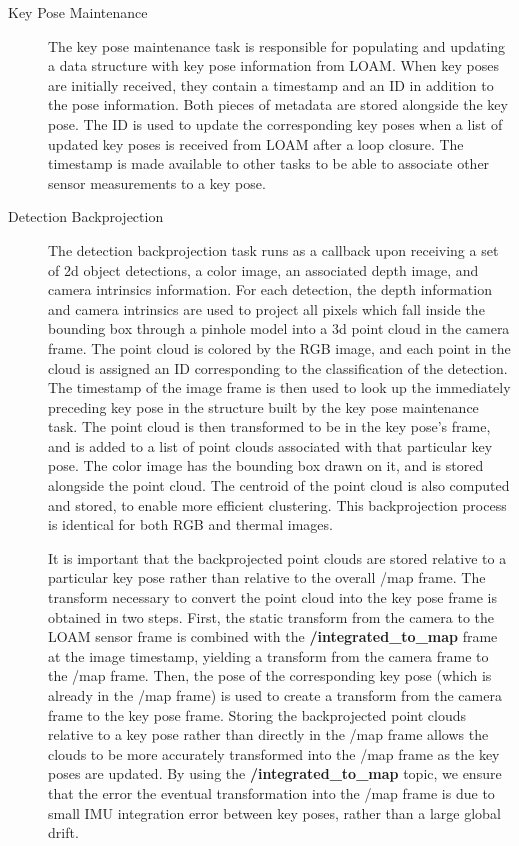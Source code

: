 \begin{description}
	\item[Key Pose Maintenance] The key pose maintenance task is responsible for populating and updating a data structure with key pose information from LOAM. When key poses are initially received, they contain a timestamp and an ID in addition to the pose information. Both pieces of metadata are stored alongside the key pose. The ID is used to update the corresponding key poses when a list of updated key poses is received from LOAM after a loop closure. The timestamp is made available to other tasks to be able to associate other sensor measurements to a key pose.
	
	\item[Detection Backprojection] The detection backprojection task runs as a callback upon receiving a set of 2d object detections, a color image, an associated depth image, and camera intrinsics information. For each detection, the depth information and camera intrinsics are used to project all pixels which fall inside the bounding box through a pinhole model into a 3d point cloud in the camera frame. The point cloud is colored by the RGB image, and each point in the cloud is assigned an ID corresponding to the classification of the detection. The timestamp of the image frame is then used to look up the immediately preceding key pose in the structure built by the key pose maintenance task. The point cloud is then transformed to be in the key pose's frame, and is added to a list of point clouds associated with that particular key pose. The color image has the bounding box drawn on it, and is stored alongside the point cloud. The centroid of the point cloud is also computed and stored, to enable more efficient clustering. This backprojection process is identical for both RGB and thermal images.
	
	It is important that the backprojected point clouds are stored relative to a particular key pose rather than relative to the overall /map frame. The transform necessary to convert the point cloud into the key pose frame is obtained in two steps. First, the static transform from the camera to the LOAM sensor frame is combined with the \textbf{/integrated\_to\_map} frame at the image timestamp, yielding a transform from the camera frame to the /map frame. Then, the pose of the corresponding key pose (which is already in the /map frame) is used to create a transform from the camera frame to the key pose frame. Storing the backprojected point clouds relative to a key pose rather than directly in the /map frame allows the clouds to be more accurately transformed into the /map frame as the key poses are updated. By using the \textbf{/integrated\_to\_map} topic, we ensure that the error the eventual transformation into the /map frame is due to small IMU integration error between key poses, rather than a large global drift.
	

\end{description}

